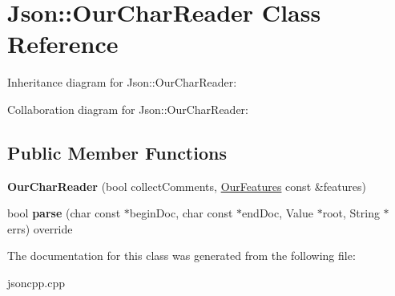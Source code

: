 \hypertarget{classJson_1_1OurCharReader}{}\section{Json\+:\+:Our\+Char\+Reader Class Reference}
\label{classJson_1_1OurCharReader}


Inheritance diagram for Json\+:\+:Our\+Char\+Reader\+:


Collaboration diagram for Json\+:\+:Our\+Char\+Reader\+:
\subsection*{Public Member Functions}
\begin{DoxyCompactItemize}
\item 
\mbox{\label{classJson_1_1OurCharReader_a5015506620e7ba7bab417756fa1ca9fe}} 
{\bfseries Our\+Char\+Reader} (bool collect\+Comments, \hyperlink{classJson_1_1OurFeatures}{Our\+Features} const \&features)
\item 
\mbox{\label{classJson_1_1OurCharReader_a2dd41a329e142d2c3750c9e1b8324732}} 
bool {\bfseries parse} (char const $\ast$begin\+Doc, char const $\ast$end\+Doc, Value $\ast$root, String $\ast$errs) override
\end{DoxyCompactItemize}


The documentation for this class was generated from the following file\+:\begin{DoxyCompactItemize}
\item 
jsoncpp.\+cpp\end{DoxyCompactItemize}

